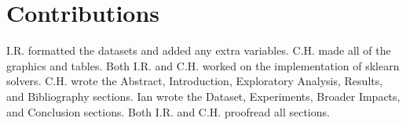 
\section{Contributions}
\label{sec:contrib}

I.R. formatted the datasets and added any extra variables. C.H. made all of the graphics and tables. Both I.R. and C.H. worked on the implementation of sklearn solvers. C.H. wrote the Abstract, Introduction, Exploratory Analysis, Results, and Bibliography sections. Ian wrote the Dataset, Experiments, Broader Impacts, and Conclusion sections. Both I.R. and C.H. proofread all sections.

